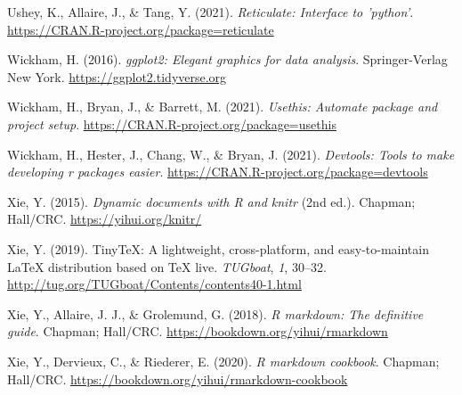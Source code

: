 \documentclass[
  man]{apa6}
\newlength{\cslhangindent}
\newlength{\cslentryspacingunit} %
\newenvironment{CSLReferences}[2] %
 {%
  \setlength{\parindent}{0pt}
  \ifodd #1
  \let\oldpar\par
  \def\par{\hangindent=\cslhangindent\oldpar}
  \fi
  \setlength{\parskip}{#2\cslentryspacingunit}
 }%
 {}
\begin{document}
\begin{CSLReferences}{1}{0}
\leavevmode{}%
Ushey, K., Allaire, J., \& Tang, Y. (2021). \emph{Reticulate: Interface to 'python'}. \url{https://CRAN.R-project.org/package=reticulate}

\leavevmode{}%
Wickham, H. (2016). \emph{ggplot2: Elegant graphics for data analysis}. Springer-Verlag New York. \url{https://ggplot2.tidyverse.org}

\leavevmode{}%
Wickham, H., Bryan, J., \& Barrett, M. (2021). \emph{Usethis: Automate package and project setup}. \url{https://CRAN.R-project.org/package=usethis}

\leavevmode{}%
Wickham, H., Hester, J., Chang, W., \& Bryan, J. (2021). \emph{Devtools: Tools to make developing r packages easier}. \url{https://CRAN.R-project.org/package=devtools}

\leavevmode{}%
Xie, Y. (2015). \emph{Dynamic documents with {R} and knitr} (2nd ed.). Chapman; Hall/CRC. \url{https://yihui.org/knitr/}

\leavevmode{}%
Xie, Y. (2019). TinyTeX: A lightweight, cross-platform, and easy-to-maintain LaTeX distribution based on TeX live. \emph{TUGboat}, \emph{1}, 30--32. \url{http://tug.org/TUGboat/Contents/contents40-1.html}

\leavevmode{}%
Xie, Y., Allaire, J. J., \& Grolemund, G. (2018). \emph{R markdown: The definitive guide}. Chapman; Hall/CRC. \url{https://bookdown.org/yihui/rmarkdown}

\leavevmode{}%
Xie, Y., Dervieux, C., \& Riederer, E. (2020). \emph{R markdown cookbook}. Chapman; Hall/CRC. \url{https://bookdown.org/yihui/rmarkdown-cookbook}

\end{CSLReferences}

\endgroup
\end{document}
